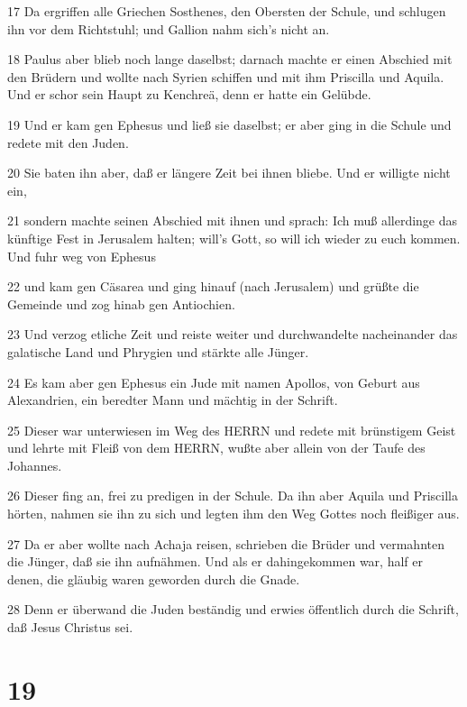 \par 17 Da ergriffen alle Griechen Sosthenes, den Obersten der Schule, und schlugen ihn vor dem Richtstuhl; und Gallion nahm sich's nicht an.
\par 18 Paulus aber blieb noch lange daselbst; darnach machte er einen Abschied mit den Brüdern und wollte nach Syrien schiffen und mit ihm Priscilla und Aquila. Und er schor sein Haupt zu Kenchreä, denn er hatte ein Gelübde.
\par 19 Und er kam gen Ephesus und ließ sie daselbst; er aber ging in die Schule und redete mit den Juden.
\par 20 Sie baten ihn aber, daß er längere Zeit bei ihnen bliebe. Und er willigte nicht ein,
\par 21 sondern machte seinen Abschied mit ihnen und sprach: Ich muß allerdinge das künftige Fest in Jerusalem halten; will's Gott, so will ich wieder zu euch kommen. Und fuhr weg von Ephesus
\par 22 und kam gen Cäsarea und ging hinauf (nach Jerusalem) und grüßte die Gemeinde und zog hinab gen Antiochien.
\par 23 Und verzog etliche Zeit und reiste weiter und durchwandelte nacheinander das galatische Land und Phrygien und stärkte alle Jünger.
\par 24 Es kam aber gen Ephesus ein Jude mit namen Apollos, von Geburt aus Alexandrien, ein beredter Mann und mächtig in der Schrift.
\par 25 Dieser war unterwiesen im Weg des HERRN und redete mit brünstigem Geist und lehrte mit Fleiß von dem HERRN, wußte aber allein von der Taufe des Johannes.
\par 26 Dieser fing an, frei zu predigen in der Schule. Da ihn aber Aquila und Priscilla hörten, nahmen sie ihn zu sich und legten ihm den Weg Gottes noch fleißiger aus.
\par 27 Da er aber wollte nach Achaja reisen, schrieben die Brüder und vermahnten die Jünger, daß sie ihn aufnähmen. Und als er dahingekommen war, half er denen, die gläubig waren geworden durch die Gnade.
\par 28 Denn er überwand die Juden beständig und erwies öffentlich durch die Schrift, daß Jesus Christus sei.

\chapter{19}

